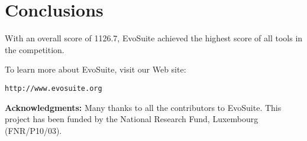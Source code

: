 \documentclass[10pt,conference,compsocconf]{IEEEtran}
\newcommand{\EVOSUITE}{{\sc EvoSuite}\xspace}
\begin{document}
\section{Conclusions}

With an overall score of 1126.7, \EVOSUITE achieved the highest score
of all tools in the competition. 


To learn more about \EVOSUITE, visit our Web site:
\begin{center}
\texttt{http://www.evosuite.org}
\end{center}



\textbf{Acknowledgments:} Many thanks to all the contributors to \EVOSUITE.
This project has been funded by 
the National Research Fund, Luxembourg (FNR/P10/03).


\def\IEEEbibitemsep{6pt}



\end{document}
